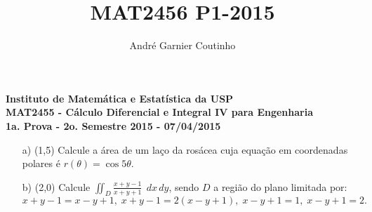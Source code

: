 \documentclass[12pt,a4paper]{article}
\title{MAT2456 P1-2015}
\author{André Garnier Coutinho}
\begin{document}
\begin{center}
\textbf{Instituto de Matemática e Estatística da USP\\
MAT2455 - Cálculo Diferencial e Integral IV para Engenharia\\}
\textbf{1a. Prova - 2o. Semestre 2015 - 07/04/2015}
\end{center}



\begin{itemize}
	\item[a)] (1,5) Calcule a área de um laço da rosácea cuja equação em coordenadas polares é $r(\theta) = \cos 5\theta$. \\
	\item[b)] (2,0) Calcule  $\displaystyle\iint_D \frac{x+y-1}{x+y+1}\; \, dx \, dy$, sendo $D$ a região do plano limitada por:
	$$ x+y-1 = x-y+1, \; x+y-1= 2(x-y+1), \; x-y+1=1, \; x-y+1 = 2.$$
	
\end{itemize}
\end{document}
